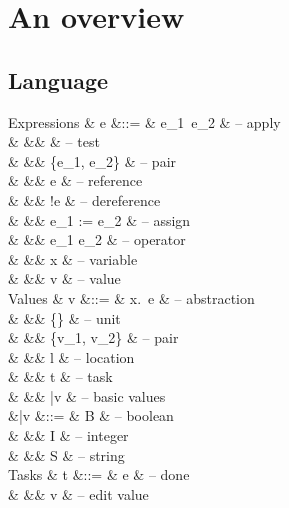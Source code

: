 
\newpage
\section{An overview}


\subsection{Language}

\begin{grammar}
  Expressions
    & e      &::= & e_1\ e_2                    & – apply \\
    &        &\mid&           & – test \\
    &        &\mid& \{e_1, e_2\}                & – pair \\
    &        &\mid& \Ref e                      & – reference \\
    &        &\mid& !e                          & – dereference \\
    &        &\mid& e_1 := e_2                  & – assign \\
    &        &\mid& e_1 \star e_2               & – operator \\
    &        &\mid& x                           & – variable \\
    &        &\mid& v                           & – value \\
  Values
    & v      &::= & \lambda x.\ e               & – abstraction \\
    &        &\mid& \{\}                        & – unit \\
    &        &\mid& \{v_1, v_2\}                & – pair \\
    &        &\mid& l                           & – location \\
    &        &\mid& t                           & – task \\
    &        &\mid& \bar{v}                     & – basic values \\
    &\bar{v} &::= & B \in \BB                   & – boolean \\
    &        &\mid& I \in \ZZ                   & – integer \\
    &        &\mid& S \in \SS                   & – string \\
  Tasks
    & t      &::= & \Done e                     & – done \\
    &        &\mid& \Edit v                     & – edit value \\

\end{grammar}
